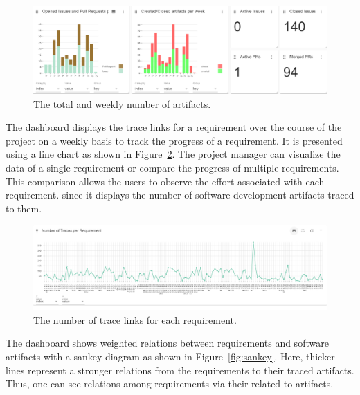 \begin{figure}[hbt]
    \centering
    \includegraphics[width=.9\linewidth]{figs/dashboard-barcharts.png}
    \caption{The total and weekly number of artifacts. }
    \label{fig:barcharts}
\end{figure}

The dashboard displays the trace links for a requirement over the course of the project on a weekly basis to track the progress of a requirement.
It is presented using a line chart as shown in Figure~\ref{fig:linechart}. 
The project manager can visualize the data of a single requirement or compare the progress of multiple requirements. %
This comparison allows the users to observe the effort associated with each requirement.%
since it displays the number of software development artifacts traced to them.

\begin{figure}[htb]
    \centering
    \includegraphics[width=.9\linewidth]{figs/linechart.png}
    \caption{The number of trace links for each requirement. }
    \label{fig:linechart}
\end{figure}

The dashboard shows weighted relations between requirements and software artifacts with  a sankey diagram as shown in Figure~\ref{fig:sankey}. %
Here, thicker lines represent a stronger relations from the requirements to their traced artifacts. 
Thus, one can see relations among requirements via their related to artifacts.

